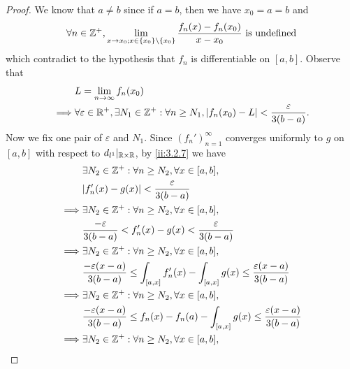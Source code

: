 \begin{proof}
  We know that \(a \neq b\) since if \(a = b\), then we have \(x_0 = a = b\) and
  \[
    \forall n \in \mathbb{Z}^+, \lim_{x \to x_0; x \in \left\lbrace x_0\right\rbrace \setminus \left\lbrace x_0\right\rbrace} \dfrac{f_n(x) - f_n(x_0)}{x - x_0} \text{ is undefined}
  \]
  which contradict to the hypothesis that \(f_n\) is differentiable on \([a, b]\).
  Observe that
  \begin{align*}
             & L = \lim_{n \to \infty} f_n(x_0)                                                                                             \\
    \implies & \forall \varepsilon \in \mathbb{R}^+, \exists N_1 \in \mathbb{Z}^+ : \forall n \geq N_1, \left\lvert f_n(x_0) - L\right\rvert < \dfrac{\varepsilon}{3(b - a)}.
  \end{align*}
  Now we fix one pair of \(\varepsilon\) and \(N_1\).
  Since \((f_n')_{n = 1}^\infty\) converges uniformly to \(g\) on \([a, b]\) with respect to \(d_{l^1}|_{\mathbb{R} \times \mathbb{R}}\), by \cref{ii:3.2.7} we have
  \begin{align*}
             & \exists N_2 \in \Z^+ : \forall n \geq N_2, \forall x \in [a, b],                                                                  \\
             & \abs{f_n'(x) - g(x)} < \dfrac{\varepsilon}{3(b - a)}                                                                              \\
    \implies & \exists N_2 \in \Z^+ : \forall n \geq N_2, \forall x \in [a, b],                                                                  \\
             & \dfrac{-\varepsilon}{3(b - a)} < f_n'(x) - g(x) < \dfrac{\varepsilon}{3(b - a)}                                                   \\
    \implies & \exists N_2 \in \Z^+ : \forall n \geq N_2, \forall x \in [a, b],                                                                  \\
             & \dfrac{-\varepsilon (x - a)}{3(b - a)} \leq \int_{[a, x]} f_n'(x) - \int_{[a, x]} g(x) \leq \dfrac{\varepsilon (x - a)}{3(b - a)} \\
    \implies & \exists N_2 \in \Z^+ : \forall n \geq N_2, \forall x \in [a, b],                                                                  \\
             & \dfrac{-\varepsilon (x - a)}{3(b - a)} \leq f_n(x) - f_n(a) - \int_{[a, x]} g(x) \leq \dfrac{\varepsilon (x - a)}{3(b - a)}       \\
    \implies & \exists N_2 \in \Z^+ : \forall n \geq N_2, \forall x \in [a, b],                                                                  \\

\end{align*}
\end{proof}
